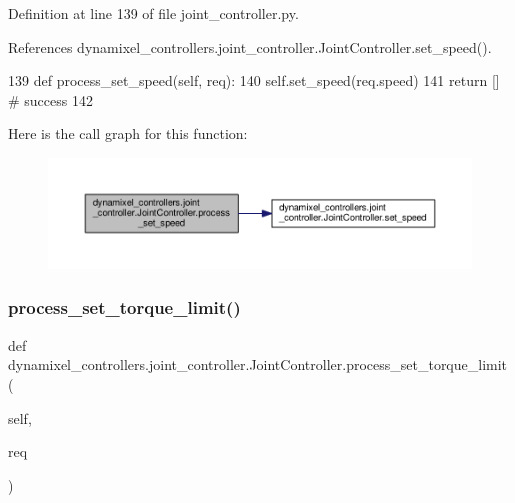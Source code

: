 Definition at line 139 of file joint\+\_\+controller.\+py.



References dynamixel\+\_\+controllers.\+joint\+\_\+controller.\+Joint\+Controller.\+set\+\_\+speed().


\begin{DoxyCode}
139     \textcolor{keyword}{def }process\_set\_speed(self, req):
140         self.set\_speed(req.speed)
141         \textcolor{keywordflow}{return} [] \textcolor{comment}{# success}
142 
\end{DoxyCode}
Here is the call graph for this function\+:
\nopagebreak
\begin{figure}[H]
\begin{center}
\leavevmode
\includegraphics[width=350pt]{d3/dcd/classdynamixel__controllers_1_1joint__controller_1_1_joint_controller_a97af096c1566307859ed168c900fa8a6_cgraph}
\end{center}
\end{figure}
\mbox{\label{classdynamixel__controllers_1_1joint__controller_1_1_joint_controller_aa199ce6ae353ed44fe71ae96a5da242d}} 
\subsubsection{\texorpdfstring{process\+\_\+set\+\_\+torque\+\_\+limit()}{process\_set\_torque\_limit()}}
{\footnotesize\ttfamily def dynamixel\+\_\+controllers.\+joint\+\_\+controller.\+Joint\+Controller.\+process\+\_\+set\+\_\+torque\+\_\+limit (\begin{DoxyParamCaption}\item[{}]{self,  }\item[{}]{req }\end{DoxyParamCaption})\hspace{0.3cm}{\ttfamily [inherited]}}



